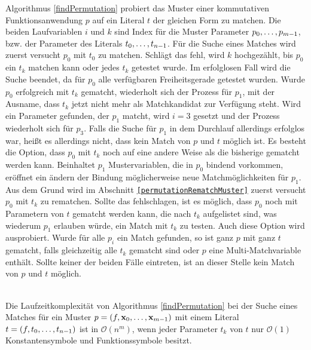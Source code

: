 Algorithmus \ref{findPermutation} probiert das Muster einer kommutativen Funktionsanwendung $p$ auf ein Literal $t$ der gleichen Form zu matchen. Die beiden Laufvariablen $i$ und $k$ sind Index für die Muster Parameter ${p}_{0}, \dots, {p}_{m-1}$, bzw. der Parameter des Literals ${t}_{0}, \dots, {t}_{n-1}$. Für die Suche eines Matches wird zuerst versucht $p_0$ mit $t_0$ zu matchen. Schlägt das fehl, wird $k$ hochgezählt, bis $p_0$ ein $t_k$ matchen kann oder jedes $t_k$ getestet wurde. Im erfolglosen Fall wird die Suche beendet, da für $p_0$ alle verfügbaren Freiheitsgerade getestet wurden. Wurde $p_0$ erfolgreich mit $t_k$ gematcht, wiederholt sich der Prozess für $p_1$, mit der Ausname, dass $t_k$ jetzt nicht mehr als Matchkandidat zur Verfügung steht. Wird ein Parameter gefunden, der $p_1$ matcht, wird $i = 3$ gesetzt und der Prozess wiederholt sich für $p_3$. Falls die Suche für $p_1$ in dem Durchlauf allerdings erfolglos war, heißt es allerdings nicht, dass kein Match von $p$ und $t$ möglich ist. Es besteht die Option, dass $p_0$ mit $t_k$ noch auf eine andere Weise als die bisherige gematcht werden kann. Beinhaltet $p_1$ Mustervariablen, die in $p_0$ bindend vorkommen, eröffnet ein ändern der Bindung möglicherweise neue Matchmöglichkeiten für $p_1$. Aus dem Grund wird im Abschnitt \texttt{\ref{permutationRematchMuster}} zuerst versucht $p_0$ mit $t_k$ zu rematchen. Sollte das fehlschlagen, ist es möglich, dass $p_0$ noch mit Parametern von $t$ gematcht werden kann, die nach $t_k$ aufgelistet sind, was wiederum $p_1$ erlauben würde, ein Match mit $t_k$ zu testen. Auch diese Option wird ausprobiert.
Wurde für alle $p_i$ ein Match gefunden, so ist ganz $p$ mit ganz $t$ gematcht, falls gleichzeitig alle $t_k$ gematcht sind oder $p$ eine Multi-Matchvariable enthält. Sollte keiner der beiden Fälle eintreten, ist an dieser Stelle kein Match von $p$ und $t$ möglich. 


\begin{lemma}\label{lemKomplexitaetFindPermutation}~\\
Die Laufzeitkomplexität von Algorithmus \ref{findPermutation} bei der Suche eines Matches für ein Muster $p = (f, {\mathbf x}_{0}, \dots, {\mathbf x}_{m-1})$ mit einem Literal $t = (f, {t}_{0}, \dots, {t}_{n-1})$ ist in $\mathcal O(n^m)$, wenn jeder Parameter $t_k$ von $t$ nur $\mathcal O(1)$ Konstantensymbole und Funktionssymbole besitzt.
\end{lemma}


